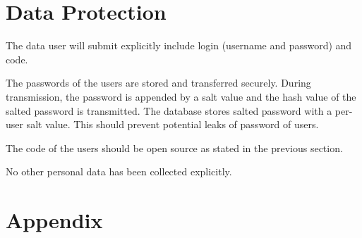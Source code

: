 \documentclass[a4paper]{article}
\begin{document}
\section{Data Protection}

The data user will submit explicitly include login (username and password) and
code.

The passwords of the users are stored and transferred securely. During
transmission, the password is appended by a salt value and the hash value of
the salted password is transmitted. The database stores salted password with a
per-user salt value. This should prevent potential leaks of password of users.

The code of the users should be open source as stated in the previous section.

No other personal data has been collected explicitly.

\newpage

\section{Appendix}
\end{document}
